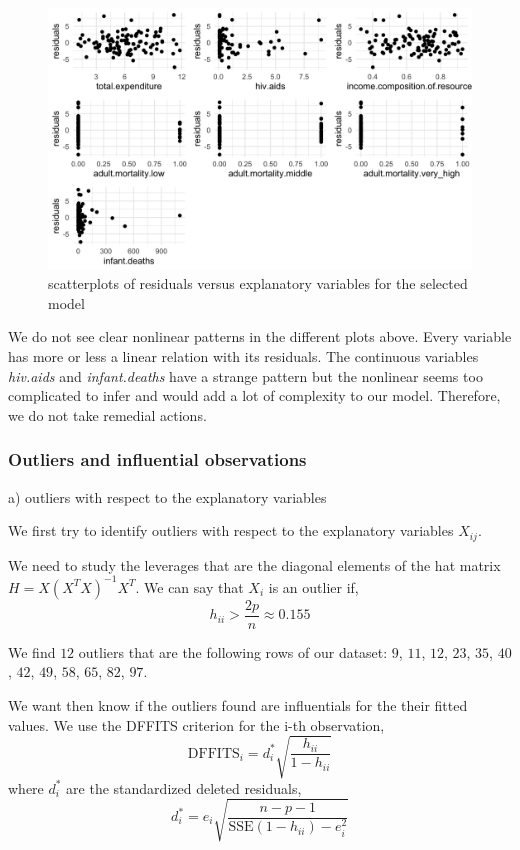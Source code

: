 \begin{figure}[H]
	\centering
	\includegraphics{figures/residuals_vs_explanatory.png}
	\caption{scatterplots of residuals versus explanatory variables for the selected model}
	\label{fig:residuals_vs_explanatory}
\end{figure}

We do not see clear nonlinear patterns in the different plots above. Every variable has more or less a linear relation with its residuals. The continuous variables \textit{hiv.aids} and \textit{infant.deaths} have a strange pattern but the nonlinear seems too complicated to infer and would add a lot of complexity to our model. Therefore, we do not take remedial actions.

\subsubsection{Outliers and influential observations}

a) outliers with respect to the explanatory variables

We first try to identify outliers with respect to the explanatory variables $X_{ij}$. 

We need to study the leverages that are the diagonal elements of the hat matrix $H = X(X^T X)^{-1}X^T$. We can say that $X_i$ is an outlier if,
\begin{equation*}
	h_{ii} > \frac{2p}{n} \approx 0.155
\end{equation*}

We find $12$ outliers that are the following rows of our dataset: $9$, $11$, $12$, $23$, $35$, $40$, $42$, $49$, $58$, $65$, $82$, $97$.

We want then know if the outliers found are influentials for the their fitted values. We use the DFFITS criterion for the i-th observation,
\begin{equation}
	\text{DFFITS}_i = d_i^{\ast} \sqrt{\frac{h_{ii}}{1 - h_{ii}}}
\end{equation}
where $d_i^{\ast}$ are the standardized deleted residuals,
\begin{equation}
	d_i^{\ast} = e_i \sqrt{\frac{n - p - 1}{\text{SSE}(1 - h_{ii}) - e_i^2}} 
\end{equation}


